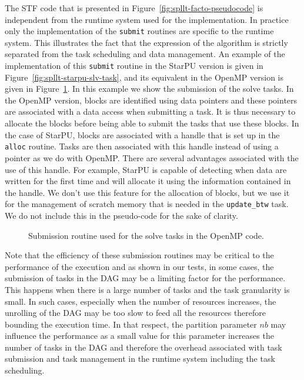 \documentclass{article}
\newcommand{\starpu}{{StarPU}\xspace}
\newcommand{\openmp}{OpenMP\xspace}
\begin{document}
The STF code that is presented in
Figure~\ref{fig:spllt-facto-pseudocode} is independent from the
runtime system used for the implementation. In practice only the
implementation of the \texttt{submit} routines are specific to the
runtime system. This illustrates the fact that the expression of the
algorithm is strictly separated from the task scheduling and data
management. An example of the implementation of this
\texttt{submit} routine in the \starpu version is given in
Figure~\ref{fig:spllt-starpu-slv-task}, and its equivalent in the
\openmp version is given in Figure~\ref{fig:spllt-omp-slv-task}. In
this example we show the submission of the solve tasks. In the \openmp
version, blocks are identified using data pointers and these pointers
are associated with a data access when submitting a task. It is thus
necessary to allocate the blocks before being able to submit the tasks
that use these blocks. In the case of \starpu, blocks are associated
with a handle that is set up in the \texttt{alloc} routine. Tasks are
then associated with this handle instead of using a pointer as we do
with \openmp. There are several advantages associated with the use of
this handle. For example, \starpu is capable of detecting when data are
written for the first time and will allocate it using the information
contained in the handle. We don't use this feature for the allocation
of blocks, but we use it for the management of scratch memory that is
needed in the \texttt{update\_btw} task. We do not include this in the
pseudo-code for the sake of clarity.

\begin{figure}[!h]
  \begin{minipage}{0.5\textwidth}
    \centering
    \lstset{basicstyle=\tt\scriptsize, language=C}
    
    \caption{\label{fig:spllt-starpu-slv-task} Submission routine used
      for the solve tasks in the \starpu code.}
  \end{minipage}
  \hspace{0.5cm}
  \begin{minipage}{0.5\textwidth}
    \centering
    \lstset{basicstyle=\tt\scriptsize}
    
    \caption{\label{fig:spllt-omp-slv-task}Submission routine used
      for the solve tasks in the \openmp code.}
  \end{minipage}
\end{figure}

Note that the efficiency of these submission routines may be critical
to the performance of the execution and as shown in our tests, in some
cases, the submission of tasks in the DAG may be a limiting factor for
the performance. This happens when there is a large number of tasks
and the task granularity is small. In such cases, especially when the
number of resources increases, the unrolling of the DAG may be too
slow to feed all the resources therefore bounding the execution
time. In that respect, the partition parameter $nb$ may influence the
performance as a small value for this parameter increases the number
of tasks in the DAG and therefore the overhead associated with
task submission and task management in the runtime system
including the task scheduling.
\end{document}
